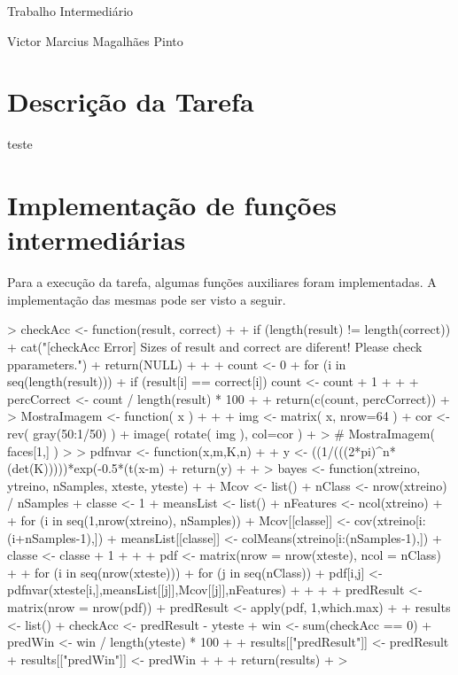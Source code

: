 \documentclass[12pt,a4paper,titlepage]{article}
\begin{document}


\begin{center}
{\huge Trabalho Intermediário}

{\large Victor Marcius Magalhães Pinto}
\end{center}

\section{Descrição da Tarefa}

teste


\section{Implementação de funções intermediárias}

Para a execução da tarefa, algumas funções auxiliares foram implementadas. A implementação das mesmas pode ser visto a seguir.

\begin{Schunk}
\begin{Sinput}
> checkAcc <- function(result, correct) {
+     
+     if (length(result) != length(correct)){
+         cat("[checkAcc Error] Sizes of result and correct are diferent! Please check pparameters.")
+         return(NULL)
+     }
+     
+     count <- 0
+     for (i in seq(length(result))) {
+         if (result[i] == correct[i]) count <- count + 1
+     }
+     
+     percCorrect <- count / length(result) * 100
+     
+     return(c(count, percCorrect))
+ }
> MostraImagem <- function( x )
+ {
+     
+     img <- matrix( x, nrow=64 )
+     cor <- rev( gray(50:1/50) )
+     image( rotate( img ), col=cor )
+ }
> # MostraImagem( faces[1,] )
> 
> pdfnvar <- function(x,m,K,n) {
+     
+     y <- ((1/(((2*pi)^n*(det(K)))))*exp(-0.5*(t(x-m)%*%(pseudoinverse(K))%*%(x-m))))
+     return(y)
+     
+ }
> bayes <- function(xtreino, ytreino, nSamples, xteste, yteste) {
+     
+     Mcov <- list()
+     nClass <- nrow(xtreino) / nSamples
+     classe <- 1
+     meansList <- list()
+     nFeatures <- ncol(xtreino)
+     
+     for (i in seq(1,nrow(xtreino), nSamples)) {
+         Mcov[[classe]] <- cov(xtreino[i:(i+nSamples-1),])
+         meansList[[classe]] <- colMeans(xtreino[i:(nSamples-1),])
+         classe <- classe + 1
+     }
+     
+     pdf <- matrix(nrow = nrow(xteste), ncol = nClass)
+     
+     for (i in seq(nrow(xteste))) {
+         for (j in seq(nClass)) {
+             pdf[i,j] <- pdfnvar(xteste[i,],meansList[[j]],Mcov[[j]],nFeatures)
+         }
+     }
+     
+     predResult <- matrix(nrow = nrow(pdf))
+     predResult <- apply(pdf, 1,which.max)
+     
+     results <- list()
+     checkAcc <- predResult - yteste
+     win <- sum(checkAcc == 0)
+     predWin <- win / length(yteste) * 100
+     
+     results[["predResult"]] <- predResult
+     results[["predWin"]] <- predWin
+     
+     
+     return(results)
+ }
> 
\end{Sinput}
\end{Schunk}
\end{document}
